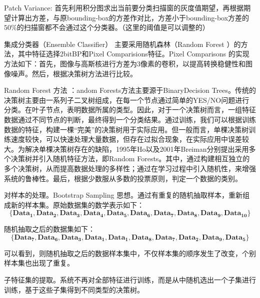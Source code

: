 Patch Variance: 首先利用积分图求出当前要分类扫描窗的灰度值期望，再根据期望计算出方差，与原bounding-box的方差作对比，方差小于bounding-box方差的$50\%$的扫描窗都不会通过这个分类器。（这里的阈值是可以调整的）

集成分类器（Ensemble Classifier） 主要采用随机森林（Random Forest ）的方法，其中特征选择2bitBP和Pixel Comparisions特征。Pixel Comparisons 的实现方法如下：首先，图像与高斯核进行方差为3像素的卷积，以提高转换稳健性和图像噪声。然后，根据决策树方法进行比较。


Random Forest 方法 ：andom Forests方法主要源于BinaryDecision Trees。传统的决策树主要由一系列子二叉树组成，在每一个节点通过简单的YES/NO问题进行分类。在叶子节点，表明数据所属的类型。因此，对于一个决策树而言，一组特征数据通过不同节点的判断，最终得到一个分类结果。通过训练，我们可以根据训练数据的特征，构建一棵“完美”的决策树用于实际应用。但一般而言，单棵决策树训练速度较快，可以快速处理大量数据，但存在过拟合现象，在实际应用中误差较大。为解决单棵决策树存在的缺陷，1995年Ho以及2001年Breiman分别提出采用多个决策树并引入随机特征方法，即Random Forests。其中，通过构建相互独立的多个决策树，从而提高数据处理的多样性；通过在学习过程中引入随机性，来增强系统的鲁棒性。最后，根据少数服从多数的投票原则，判定一个数据的类别。

对样本的处理。Bootstrap Sampling 思想。通过有重复的随机抽取样本，重新组成新的样本集。原始数据集的数学表示如下：
$$\mathbf{\{Dat}{{\mathbf{a}}_{\mathbf{1}}}\mathbf{,Dat}{{\mathbf{a}}_{\mathbf{2}}}\mathbf{,Dat}{{\mathbf{a}}_{\mathbf{3}}}\mathbf{,Dat}{{\mathbf{a}}_{\mathbf{4}}}\mathbf{,Dat}{{\mathbf{a}}_{\mathbf{5}}}\mathbf{,Dat}{{\mathbf{a}}_{\mathbf{6}}}\mathbf{,Dat}{{\mathbf{a}}_{\mathbf{7}}}\mathbf{,Dat}{{\mathbf{a}}_{\mathbf{8}}}\mathbf{,Dat}{{\mathbf{a}}_{\mathbf{9}}}\mathbf{,Dat}{{\mathbf{a}}_{\mathbf{10}}}\mathbf{\}}$$

随机抽取之后的数据集如下：
$$\mathbf{\{Dat}{{\mathbf{a}}_{\mathbf{7}}}\mathbf{,Dat}{{\mathbf{a}}_{\mathbf{6}}}\mathbf{,Dat}{{\mathbf{a}}_{\mathbf{3}}}\mathbf{,Dat}{{\mathbf{a}}_{\mathbf{1}}}\mathbf{,Dat}{{\mathbf{a}}_{\mathbf{1}}}\mathbf{,Dat}{{\mathbf{a}}_{\mathbf{8}}}\mathbf{,Dat}{{\mathbf{a}}_{\mathbf{7}}}\mathbf{,Dat}{{\mathbf{a}}_{\mathbf{2}}}\mathbf{,Dat}{{\mathbf{a}}_{\mathbf{9}}}\mathbf{,Dat}{{\mathbf{a}}_{\mathbf{5}}}\mathbf{\}}$$

可以看到，则随机抽取之后的数据样本集中，不仅样本集的顺序发生了改变，个别样本集也出现了重复。

子特征集的提取。系统不再对全部特征进行训练，而是从中随机选出一个子集进行训练，基于这些子集得到不同类型的决策树。


